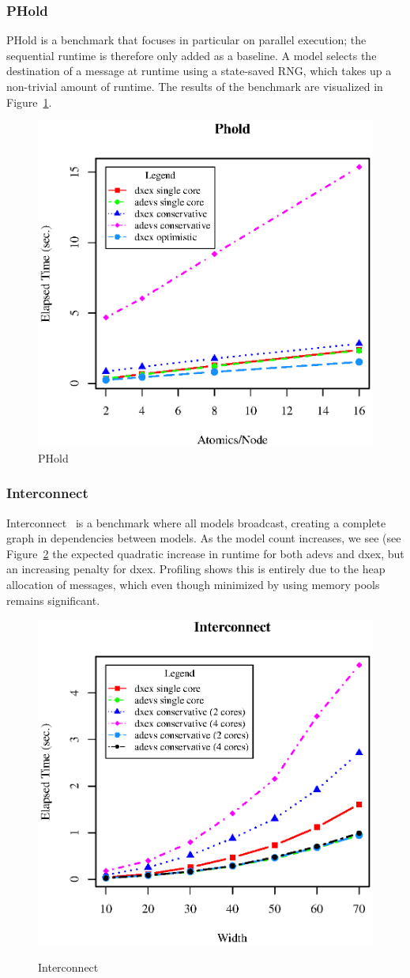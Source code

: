 \subsubsection{PHold}
PHold \cite{PHOLD} is a benchmark that focuses in particular on parallel execution; the sequential runtime is therefore only added as a baseline. A model selects the destination of a message at runtime using a state-saved RNG, which takes up a non-trivial amount of runtime. The results of the benchmark are visualized in Figure~\ref{fig:PHold}.
\begin{figure}[h]
	\includegraphics[width=.5\textwidth]{fig/fig4.eps}
	\caption{PHold}
	\label{fig:PHold}
\end{figure}

\subsubsection{Interconnect}
Interconnect~\cite{MasterThesis} is a benchmark where all models broadcast, creating a complete graph in dependencies between models. As the model count increases, we see (see Figure~\ref{fig:Interconnect} the expected quadratic increase in runtime for both adevs and dxex, but an increasing penalty for dxex. Profiling shows this is entirely due to the heap allocation of messages, which even though minimized by using memory pools remains significant.
\begin{figure}[h]
	\includegraphics[width=.5\textwidth]{fig/fig3.eps}
	\label{fig3.eps}
	\caption{Interconnect}
	\label{fig:Interconnect}
\end{figure}

